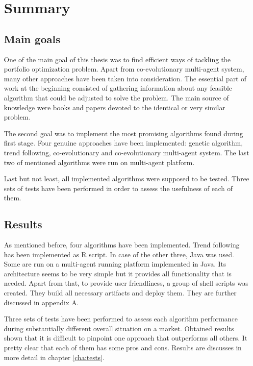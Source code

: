 \chapter{Summary}

\section{Main goals}

One of the main goal of this thesis was to find efficient ways of tackling the portfolio optimization problem.
Apart from co-evolutionary multi-agent system, many other approaches have been taken into consideration.
The essential part of work at the beginning consisted of gathering information about any feasible algorithm that could be adjusted to solve the problem. 
The main source of knowledge were books and papers devoted to the identical or very similar problem. 

The second goal was to implement the most promising algorithms found during first stage.
Four genuine approaches have been implemented: genetic algorithm, trend following, co-evolutionary and co-evolutionary multi-agent system.
The last two of mentioned algorithms were run on multi-agent platform. 

Last but not least, all implemented algorithms were supposed to be tested. 
Three sets of tests have been performed in order to assess the usefulness of each of them.


\section{Results}

As mentioned before, four algorithms have been implemented.
Trend following has been implemented as R script.
In case of the other three, Java was used.
Some are run on a multi-agent running platform implemented in Java.
Its architecture seems to be very simple but it provides all functionality that is needed.
Apart from that, to provide user friendliness, a group of shell scripts was created.
They build all necessary artifacts and deploy them.
They are further discussed in appendix A.
   
Three sets of tests have been performed to assess each algorithm performance during substantially different overall situation on a market.
Obtained results shown that it is difficult to pinpoint one approach that outperforms all others.
It pretty clear that each of them has some pros and cons.
Results are discusses in more detail in chapter \ref{cha:tests}.


